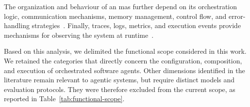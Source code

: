 The organization and behaviour of an \gls{mas} further depend on its
orchestration logic, communication mechanisms, memory management, control flow,
and error-handling strategies~\cite{emde2026maseval}. Finally, traces, logs,
metrics, and execution events provide mechanisms for observing the system at
runtime~\cite{dong2024agentops}.

Based on this analysis, we delimited the functional scope considered in this
work. We retained the categories that directly concern the configuration,
composition, and execution of orchestrated software agents. Other dimensions
identified in the literature remain relevant to agentic systems, but require
distinct models and evaluation protocols. They were therefore excluded from
the current scope, as reported in
Table~\ref{tab:functional-scope}.

